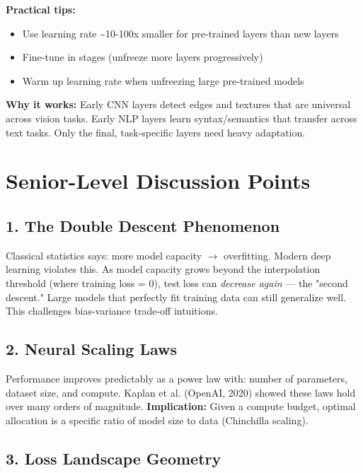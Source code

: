\documentclass[11pt]{article}
\providecommand{\tightlist}{\setlength{\itemsep}{1pt}\setlength{\parskip}{0pt}}
\begin{document}
\textbf{Practical tips:}

\begin{itemize}
\tightlist
\item
  Use learning rate \textasciitilde10-100x smaller for pre-trained layers than new layers
\item
  Fine-tune in stages (unfreeze more layers progressively)
\item
  Warm up learning rate when unfreezing large pre-trained models
\end{itemize}

\textbf{Why it works:} Early CNN layers detect edges and textures that are universal across vision tasks. Early NLP layers learn syntax/semantics that transfer across text tasks. Only the final, task-specific layers need heavy adaptation.

\section{Senior-Level Discussion Points}\label{senior-level-discussion-points}

\subsection{1. The Double Descent Phenomenon}\label{1-the-double-descent-phenomenon}

Classical statistics says: more model capacity \(\rightarrow\) overfitting. Modern deep learning violates this. As model capacity grows beyond the interpolation threshold (where training loss = 0), test loss can \emph{decrease again} --- the "second descent." Large models that perfectly fit training data can still generalize well. This challenges bias-variance trade-off intuitions.

\subsection{2. Neural Scaling Laws}\label{2-neural-scaling-laws}

Performance improves predictably as a power law with: number of parameters, dataset size, and compute. Kaplan et al. (OpenAI, 2020) showed these laws hold over many orders of magnitude. \textbf{Implication:} Given a compute budget, optimal allocation is a specific ratio of model size to data (Chinchilla scaling).

\subsection{3. Loss Landscape Geometry}\label{3-loss-landscape-geometry}
\end{document}
